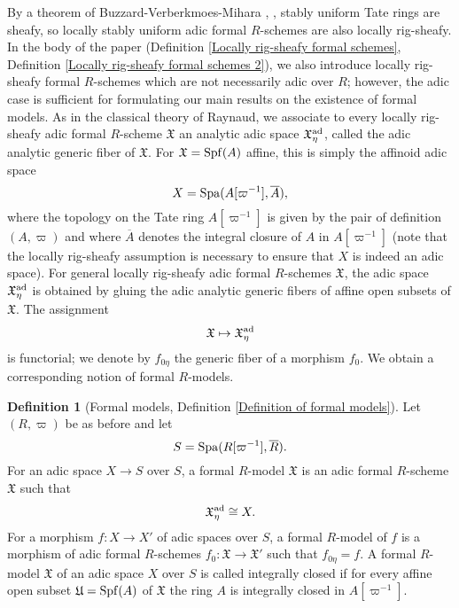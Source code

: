 \documentclass[12pt,twoside,a4paper]{article}
\theoremstyle{definition}
\newtheorem{mydef}[thm]{Definition}
\theoremstyle{remark}
\newcommand\ad{{\rm ad}}
\newcommand\Spa{{\rm Spa}}
\newcommand\Spf{{\rm Spf}}
\begin{document}
By a theorem of Buzzard-Verberkmoes-Mihara \cite{BV}, \cite{Mihara}, stably uniform Tate rings are sheafy, so locally stably uniform adic formal $R$-schemes are also locally rig-sheafy. In the body of the paper (Definition \ref{Locally rig-sheafy formal schemes}, Definition \ref{Locally rig-sheafy formal schemes 2}), we also introduce locally rig-sheafy formal $R$-schemes which are not necessarily adic over $R$; however, the adic case is sufficient for formulating our main results on the existence of formal models. As in the classical theory of Raynaud, we associate to every locally rig-sheafy adic formal $R$-scheme $\mathfrak{X}$ an analytic adic space $\mathfrak{X}_{\eta}^{\ad}$, called the adic analytic generic fiber of $\mathfrak{X}$. For $\mathfrak{X}=\Spf(A)$ affine, this is simply the affinoid adic space \begin{equation*}X=\Spa(A[\varpi^{-1}], \overline{A}),\end{equation*}where the topology on the Tate ring $A[\varpi^{-1}]$ is given by the pair of definition $(A, \varpi)$ and where $\overline{A}$ denotes the integral closure of $A$ in $A[\varpi^{-1}]$ (note that the locally rig-sheafy assumption is necessary to ensure that $X$ is indeed an adic space). For general locally rig-sheafy adic formal $R$-schemes $\mathfrak{X}$, the adic space $\mathfrak{X}_{\eta}^{\ad}$ is obtained by gluing the adic analytic generic fibers of affine open subsets of $\mathfrak{X}$. The assignment \begin{equation*}\mathfrak{X}\mapsto \mathfrak{X}_{\eta}^{\ad}\end{equation*}is functorial; we denote by $f_{0\eta}$ the generic fiber of a morphism $f_{0}$. We obtain a corresponding notion of formal $R$-models. 
\begin{mydef}[Formal models, Definition \ref{Definition of formal models}]Let $(R, \varpi)$ be as before and let \begin{equation*}S=\Spa(R[\varpi^{-1}], \overline{R}).\end{equation*}For an adic space $X\to S$ over $S$, a formal $R$-model $\mathfrak{X}$ is an adic formal $R$-scheme $\mathfrak{X}$ such that \begin{equation*}\mathfrak{X}_{\eta}^{\ad}\cong X.\end{equation*}For a morphism $f: X\to X'$ of adic spaces over $S$, a formal $R$-model of $f$ is a morphism of adic formal $R$-schemes $f_{0}: \mathfrak{X}\to\mathfrak{X}'$ such that $f_{0\eta}=f$. A formal $R$-model $\mathfrak{X}$ of an adic space $X$ over $S$ is called integrally closed if for every affine open subset $\mathfrak{U}=\Spf(A)$ of $\mathfrak{X}$ the ring $A$ is integrally closed in $A[\varpi^{-1}]$.\end{mydef}
\end{document}
